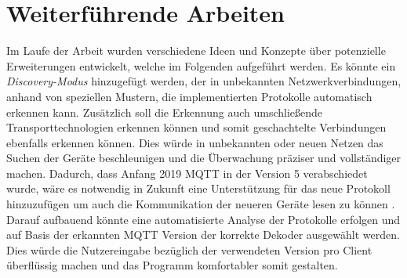 \section{Weiterführende Arbeiten}
Im Laufe der Arbeit wurden verschiedene Ideen und Konzepte über potenzielle Erweiterungen entwickelt, welche im Folgenden aufgeführt werden.
Es könnte ein \emph{Discovery-Modus} hinzugefügt werden, der in unbekannten Netzwerkverbindungen, anhand von speziellen Mustern, die implementierten Protokolle automatisch erkennen kann. Zusätzlich soll die Erkennung auch umschließende Transporttechnologien erkennen können und somit geschachtelte Verbindungen ebenfalls erkennen können. Dies würde in unbekannten oder neuen Netzen das Suchen der Geräte beschleunigen und die Überwachung präziser und vollständiger machen.
Dadurch, dass Anfang 2019 MQTT in der Version 5 verabschiedet wurde, wäre es notwendig in Zukunft eine Unterstützung für das neue Protokoll hinzuzufügen um auch die Kommunikation der neueren Geräte lesen zu können \cite{mqtt_org_2019}.
Darauf aufbauend könnte eine automatisierte Analyse der Protokolle erfolgen und auf Basis der erkannten \ac{MQTT} Version der korrekte Dekoder ausgewählt werden. Dies würde die Nutzereingabe bezüglich der verwendeten Version pro Client überflüssig machen und das Programm komfortabler somit gestalten.
